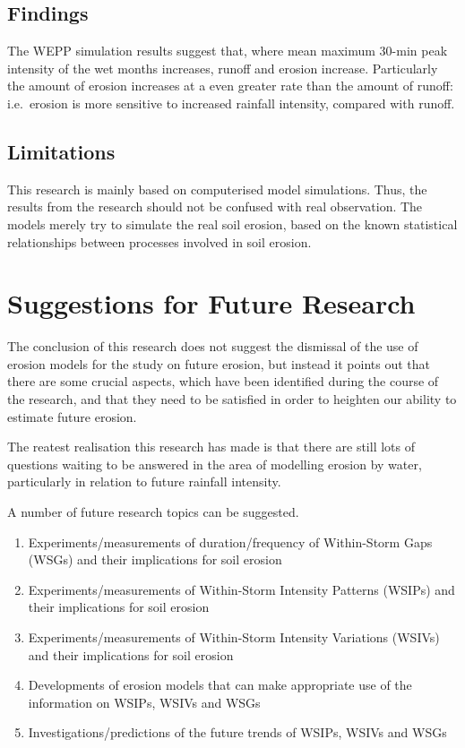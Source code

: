 \subsection{Findings}
\label{sec:FindingsStage4}

The WEPP simulation results suggest that, where mean maximum 30-min peak
intensity of the wet months increases, runoff and erosion increase. Particularly
the amount of erosion increases at a even greater rate than the amount of
runoff: i.e.\ erosion is more sensitive to increased rainfall intensity, compared
with runoff.


\subsection{Limitations}
\label{sec:LimitationsStage4}
This research is mainly based on computerised model simulations. Thus, the
results from the research should not be confused with real observation. The
models merely try to simulate the real soil erosion, based on the known
statistical relationships between processes involved in soil erosion.

\section{Suggestions for Future Research}
\label{sec:SuggestionsForFutureResearch}

The conclusion of this research does not suggest the dismissal of the use of
erosion models for the study on future erosion, but instead it points out that
there are some crucial aspects, which have been identified during the course of
the research, and that they need to be satisfied in order to heighten our
ability to estimate future erosion.

The reatest realisation this research has made is that there are still lots of
questions waiting to be answered in the area of modelling erosion by water,
particularly in relation to future rainfall intensity.

A number of future research topics can be suggested.
\begin{enumerate}
  \item Experiments/measurements of duration/frequency of Within-Storm Gaps
(WSGs) and their implications for soil erosion
  \item Experiments/measurements of Within-Storm Intensity Patterns (WSIPs) and
their implications for soil erosion
  \item Experiments/measurements of Within-Storm Intensity Variations (WSIVs)
and their implications for soil erosion
  \item Developments of erosion models that can make appropriate use of the
information on WSIPs, WSIVs and WSGs
  \item Investigations/predictions of the future trends of WSIPs, WSIVs and WSGs
\end{enumerate}

